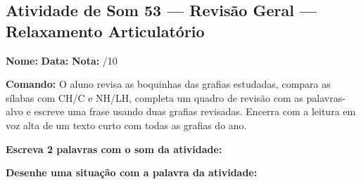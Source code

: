 \subsection{Atividade de Som 53 --- Revisão Geral — Relaxamento Articulatório}
\begin{exercicio}



\noindent\textbf{Nome:} \underline{\hspace{3.2cm}} \quad \textbf{Data:} \underline{\hspace{1.6cm}} \quad \textbf{Nota:} \underline{\hspace{0.9cm}}/10


\noindent\textbf{Comando:} O aluno revisa as boquinhas das grafias estudadas, compara as sílabas com CH/C e NH/LH, completa um quadro de revisão com as palavras-alvo e escreve uma frase usando duas grafias revisadas. Encerra com a leitura em voz alta de um texto curto com todas as grafias do ano.


\begin{center}
\end{center}

\noindent\textbf{Escreva 2 palavras com o som da atividade:}

\begin{center}
  \underline{\hspace{3cm}} \quad \underline{\hspace{3cm}}
\end{center}

\noindent\textbf{Desenhe uma situação com a palavra da atividade:}

\begin{center}
\end{center}

\end{exercicio}

